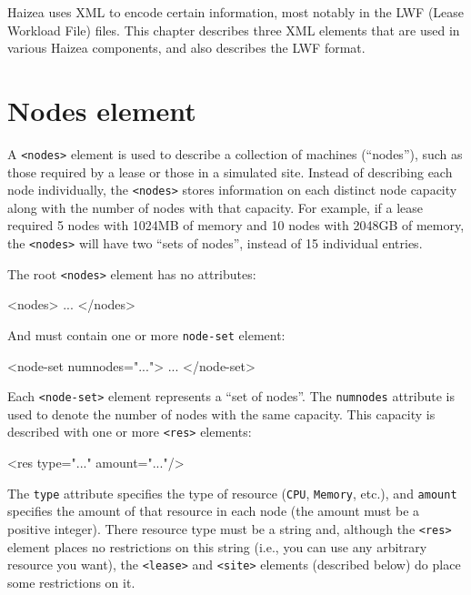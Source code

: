 Haizea uses XML to encode certain information, most notably in the LWF (Lease Workload File) files. This chapter describes three XML elements that are used in various Haizea components, and also describes the LWF format.

\section{Nodes element}

A \texttt{<nodes>} element is used to describe a collection of machines (``nodes''), such as those required by a lease or those in a simulated site. Instead of describing each node individually, the \texttt{<nodes>} stores information on each distinct node capacity along with the number of nodes with that capacity. For example, if a lease required 5 nodes with 1024MB of memory and 10 nodes with 2048GB of memory, the \texttt{<nodes>} will have two ``sets of nodes'', instead of 15 individual entries.

The root \texttt{<nodes>} element has no attributes:

\begin{wideshellverbatim} 
<nodes>
  ...
</nodes>
\end{wideshellverbatim}

And must contain one or more \texttt{node-set} element:

\begin{wideshellverbatim} 
<node-set numnodes="...">
  ...
</node-set>
\end{wideshellverbatim}

Each \texttt{<node-set>} element represents a ``set of nodes''. The \texttt{numnodes} attribute is used to denote the number of nodes with the same capacity. This capacity is described with one or more \texttt{<res>} elements:

\begin{wideshellverbatim} 
<res type="..." amount="..."/>
\end{wideshellverbatim}

The \texttt{type} attribute specifies the type of resource (\texttt{CPU}, \texttt{Memory}, etc.), and \texttt{amount} specifies the amount of that resource in each node (the amount must be a positive integer). There resource type must be a string and, although the \texttt{<res>} element places no restrictions on this string (i.e., you can use any arbitrary resource you want), the \texttt{<lease>} and \texttt{<site>} elements (described below) do place some restrictions on it.

